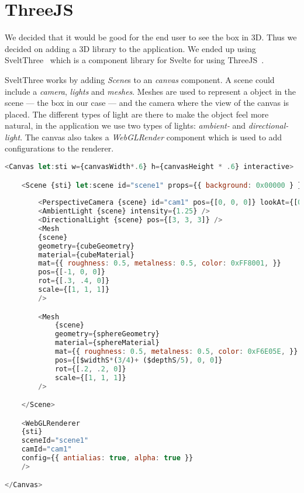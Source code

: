 \section{ThreeJS}
We decided that it would be good for the end user to see the box in 3D. Thus we 
decided on adding a 3D library to the application. We ended up using 
SveltThree~\cite{sveltthree} which is a component library for Svelte for using 
ThreeJS~\cite{threejs}. 

SveltThree works by adding \textit{Scene}s to an \textit{canvas} component. A scene 
could include a \textit{camera}, \textit{lights} and \textit{meshes}. Meshes are 
used to represent a object in the scene --- the box in our case --- and the camera 
where the view of the canvas is placed. The different types of light are there to 
make the object feel more natural, in the application we use two types of lights: 
\textit{ambient-} and \textit{directional-light}. The canvas also takes a 
\textit{WebGLRender} component which is used to add configurations to the renderer. 

\begin{lstlisting}[caption={Example of a SveltThree setup},label=sveltthreesetup, language=javascript]
<Canvas let:sti w={canvasWidth*.6} h={canvasHeight * .6} interactive>

    <Scene {sti} let:scene id="scene1" props={{ background: 0x00000 } } >
        
        <PerspectiveCamera {scene} id="cam1" pos={[0, 0, 0]} lookAt={[0, 0, 0]} />
        <AmbientLight {scene} intensity={1.25} />
        <DirectionalLight {scene} pos={[3, 3, 3]} />
        <Mesh
        {scene}
        geometry={cubeGeometry}
        material={cubeMaterial}
        mat={{ roughness: 0.5, metalness: 0.5, color: 0xFF8001, }}
        pos={[-1, 0, 0]}
        rot={[.3, .4, 0]}
        scale={[1, 1, 1]} 
        />

        <Mesh
            {scene}
            geometry={sphereGeometry}
            material={sphereMaterial}
            mat={{ roughness: 0.5, metalness: 0.5, color: 0xF6E05E, }}
            pos={[$widthS*(3/4)+ ($depthS/5), 0, 0]}
            rot={[.2, .2, 0]}
            scale={[1, 1, 1]} 
        />

    </Scene>

    <WebGLRenderer
    {sti}
    sceneId="scene1"
    camId="cam1"
    config={{ antialias: true, alpha: true }} 
    />

</Canvas>
\end{lstlisting}


